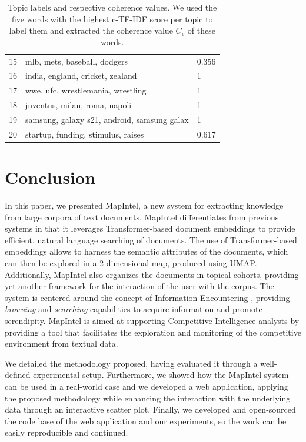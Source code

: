 \documentclass[a4paper]{article}
\begin{document}
\begin{table}[H]
{\begin{tabular}{@{}Sll@{}}
      15                          & mlb, mets, baseball, dodgers                  & 0.356                         \\
      16                          & india, england, cricket, zealand              & 1                             \\
      17                          & wwe, ufc, wrestlemania, wrestling             & 1                             \\
      18                          & juventus, milan, roma, napoli                 & 1                             \\
      19                          & samsung, galaxy s21, android, samsung galax   & 1                             \\
      20                          & startup, funding, stimulus, raises            & 0.617                         \\  \bottomrule
    \end{tabular}%
  }
  \caption{Topic labels and respective coherence values. We used the five words with the highest c-TF-IDF score per topic to label them and extracted the coherence value $C_v$ of these words.}
  \label{topic_labels}
\end{table}

\section{Conclusion}
In this paper, we presented MapIntel, a new system for extracting knowledge from large corpora of text documents. MapIntel differentiates from previous systems in that it leverages Transformer-based document embeddings to provide efficient, natural language searching of documents. The use of Transformer-based embeddings allows to harness the semantic attributes of the documents, which can then be explored in a 2-dimensional map, produced using UMAP. Additionally, MapIntel also organizes the documents in topical cohorts, providing yet another framework for the interaction of the user with the corpus. The system is centered around the concept of Information Encountering \citep{erdelez2020}, providing \emph{browsing} and \emph{searching} capabilities to acquire information and promote serendipity. MapIntel is aimed at supporting Competitive Intelligence analysts by providing a tool that facilitates the exploration and monitoring of the competitive environment from textual data.

We detailed the methodology proposed, having evaluated it through a well-defined experimental setup. Furthermore, we showed how the MapIntel system can be used in a real-world case and we developed a web application, applying the proposed methodology while enhancing the interaction with the underlying data through an interactive scatter plot. Finally, we developed and open-sourced the code base of the web application and our experiments, so the work can be easily reproducible and continued.
\end{document}
